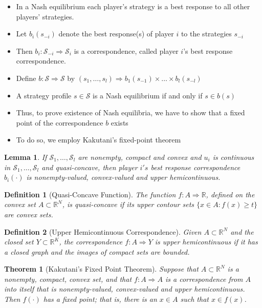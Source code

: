\documentclass[12pt]{extreport} %
\theoremstyle{named}
\theoremstyle{itshape}
\newtheorem{theorem}[unnamedtheorem]{Theorem}
\newtheorem*{definition}{Definition}
\theoremstyle{normal}
\newtheorem{lemma}[unnamedtheorem]{Lemma}
\begin{document}
\begin{itemize}
	\item In a Nash equilibrium each player's strategy is a best response to all other players' strategies.
	\item Let $b_i(s_{-i})$ denote the best response(s) of player $i$ to the strategies $s_{-i}$
	\item Then $b_i \colon \mathcal{S}_{-i} \Rightarrow \mathcal{S}_i$ is a correspondence, called player $i$'s best response correspondence.
	\item Define $b \colon \mathcal{S} \Rightarrow \mathcal{S}$ by $(s_1, \dotsc, s_l) \Rightarrow b_1(s_{-1}) \times \dotsc \times b_l(s_{-l})$
	\item A strategy profile $s \in \mathcal{S}$ is a Nash equilibrium if and only if $s \in b(s)$
	\item Thus, to prove existence of Nash equilibria, we have to show that a fixed point of the correspondence $b$ exists
	\item To do so, we employ Kakutani's fixed-point theorem
\end{itemize} 
 
\begin{lemma}
	If $\mathcal{S}_1, \dotsc, \mathcal{S}_l$ are nonempty, compact and convex and $u_i$ is continuous in $\mathcal{S}_1, \dotsc, \mathcal{S}_l$ and quasi-concave, then player $i's$ best response correspondence $b_i(\cdot)$ is nonempty-valued, convex-valued and upper hemicontinuous.
\end{lemma} 
 
\begin{definition}[Quasi-Concave Function]
	The function $f \colon A \Rightarrow \mathbb{R}$, defined on the convex set $A \subset \mathbb{R}^N$, is quasi-concave if its upper contour sets $\{ x \in A \colon f(x) \geq t \}$ are convex sets.
\end{definition} 
 
\begin{definition}[Upper Hemicontinuous Correspondence]
	Given $A \subset \mathbb{R}^{N}$ and the closed set $Y \subset \mathbb{R}^{K}$, the correspondence $f \colon A \Rightarrow Y$ is upper hemicontinuous if it has a closed graph and the images of compact sets are bounded.
\end{definition} 

\begin{theorem}[Kakutani's Fixed Point Theorem]
	Suppose that $A \subset \mathbb{R}^N$ is a nonempty, compact, convex set, and that $f \colon A \Rightarrow A$ is a correspondence from $A$ into itself that is nonempty-valued, convex-valued and upper hemicontinuous. ~\\
	
	Then $f(\cdot)$ has a fixed point; that is, there is an $x \in A$ such that $x \in f(x)$.
\end{theorem}
 
\end{document}
